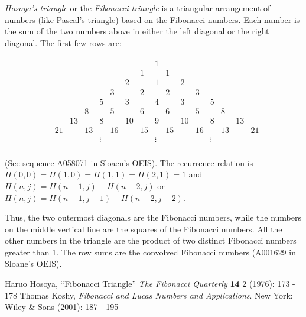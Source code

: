 \documentclass[12pt]{article}
\begin{document}
{\em Hosoya's triangle} or the {\em Fibonacci triangle} is a triangular arrangement of numbers (like Pascal's triangle) based on the Fibonacci numbers. Each number is the sum of the two numbers above in either the left diagonal or the right diagonal. The first few rows are:

\begin{eqnarray*}
\begin{array}{cccccccccccccccccc}
& & & & & & & & & 1 & & & & & & & &\\
& & & & & & & & 1 & & 1 & & & & & & &\\
& & & & & & & 2 & & 1 & & 2 & & & & & &\\
& & & & & & 3 & & 2 & & 2 & & 3 & & & & &\\
& & & & & 5 & & 3 & & 4 & & 3 & & 5 & & & &\\
& & & & 8 & & 5 & & 6 & & 6 & & 5 & & 8 & & &\\
& & & 13 & & 8 & & 10 & & 9 & & 10 & & 8 & & 13 & &\\
& & 21 & & 13 & & 16 & & 15 & & 15 & & 16 & & 13 & & 21 &\\
& & & & &\vdots & & & & \vdots & & & & \vdots& & & & \\
\end{array}
\end{eqnarray*}

(See sequence A058071 in Sloaen's OEIS). The recurrence relation is $H(0, 0) = H(1, 0) = H(1, 1) = H(2, 1) = 1$ and $H(n, j) = H(n - 1, j) + H(n - 2, j)$ or $H(n, j) = H(n - 1, j - 1) + H(n - 2, j - 2)$.

Thus, the two outermost diagonals are the Fibonacci numbers, while the numbers on the middle vertical line are the squares of the Fibonacci numbers. All the other numbers in the triangle are the product of two distinct Fibonacci numbers greater than 1. The row sums are the convolved Fibonacci numbers (A001629 in Sloane's OEIS).

\begin{thebibliography}{2}
 Haruo Hosoya, ``Fibonacci Triangle'' {\it The Fibonacci Quarterly} {\bf 14} 2 (1976): 173 - 178 
 Thomas Koshy, {\it Fibonacci and Lucas Numbers and Applications}. New York: Wiley \& Sons (2001): 187 - 195
\end{thebibliography}
\end{document}
